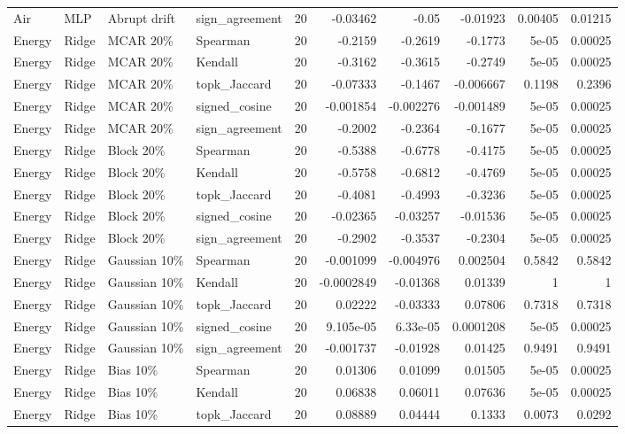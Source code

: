 \begin{tabular}{llllrrrrrr}
Air & MLP & Abrupt drift & sign\_agreement & 20 & -0.03462 & -0.05 & -0.01923 & 0.00405 & 0.01215 \\
Energy & Ridge & MCAR 20\% & Spearman & 20 & -0.2159 & -0.2619 & -0.1773 & 5e-05 & 0.00025 \\
Energy & Ridge & MCAR 20\% & Kendall & 20 & -0.3162 & -0.3615 & -0.2749 & 5e-05 & 0.00025 \\
Energy & Ridge & MCAR 20\% & topk\_Jaccard & 20 & -0.07333 & -0.1467 & -0.006667 & 0.1198 & 0.2396 \\
Energy & Ridge & MCAR 20\% & signed\_cosine & 20 & -0.001854 & -0.002276 & -0.001489 & 5e-05 & 0.00025 \\
Energy & Ridge & MCAR 20\% & sign\_agreement & 20 & -0.2002 & -0.2364 & -0.1677 & 5e-05 & 0.00025 \\
Energy & Ridge & Block 20\% & Spearman & 20 & -0.5388 & -0.6778 & -0.4175 & 5e-05 & 0.00025 \\
Energy & Ridge & Block 20\% & Kendall & 20 & -0.5758 & -0.6812 & -0.4769 & 5e-05 & 0.00025 \\
Energy & Ridge & Block 20\% & topk\_Jaccard & 20 & -0.4081 & -0.4993 & -0.3236 & 5e-05 & 0.00025 \\
Energy & Ridge & Block 20\% & signed\_cosine & 20 & -0.02365 & -0.03257 & -0.01536 & 5e-05 & 0.00025 \\
Energy & Ridge & Block 20\% & sign\_agreement & 20 & -0.2902 & -0.3537 & -0.2304 & 5e-05 & 0.00025 \\
Energy & Ridge & Gaussian 10\% & Spearman & 20 & -0.001099 & -0.004976 & 0.002504 & 0.5842 & 0.5842 \\
Energy & Ridge & Gaussian 10\% & Kendall & 20 & -0.0002849 & -0.01368 & 0.01339 & 1 & 1 \\
Energy & Ridge & Gaussian 10\% & topk\_Jaccard & 20 & 0.02222 & -0.03333 & 0.07806 & 0.7318 & 0.7318 \\
Energy & Ridge & Gaussian 10\% & signed\_cosine & 20 & 9.105e-05 & 6.33e-05 & 0.0001208 & 5e-05 & 0.00025 \\
Energy & Ridge & Gaussian 10\% & sign\_agreement & 20 & -0.001737 & -0.01928 & 0.01425 & 0.9491 & 0.9491 \\
Energy & Ridge & Bias 10\% & Spearman & 20 & 0.01306 & 0.01099 & 0.01505 & 5e-05 & 0.00025 \\
Energy & Ridge & Bias 10\% & Kendall & 20 & 0.06838 & 0.06011 & 0.07636 & 5e-05 & 0.00025 \\
Energy & Ridge & Bias 10\% & topk\_Jaccard & 20 & 0.08889 & 0.04444 & 0.1333 & 0.0073 & 0.0292 \\

\end{tabular}
